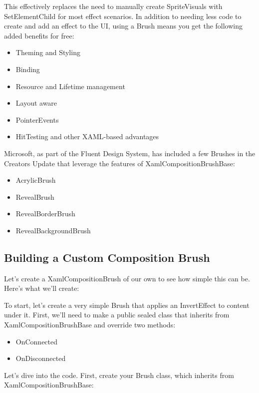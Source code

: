 This effectively replaces the need to manually create SpriteVisuals with SetElementChild for most effect scenarios. In addition to needing less code to create and add an effect to the UI, using a Brush means you get the following added benefits for free:

\begin{itemize}
	\item Theming and Styling
	\item Binding
	\item Resource and Lifetime management
	\item Layout aware
	\item PointerEvents
	\item HitTesting and other XAML-based advantages
\end{itemize}

Microsoft, as part of the Fluent Design System, has included a few Brushes in the Creators Update that leverage the features of XamlCompositionBrushBase:

\begin{itemize}
	\item AcrylicBrush
	\item RevealBrush
	\item RevealBorderBrush
	\item RevealBackgroundBrush
\end{itemize}

\subsection{Building a Custom Composition Brush}

Let’s create a XamlCompositionBrush of our own to see how simple this can be.  Here’s what we’ll create:


To start, let’s create a very simple Brush that applies an InvertEffect to content under it. First, we’ll need to make a public sealed class that inherits from XamlCompositionBrushBase and override two methods:

\begin{itemize}
	\item OnConnected
	\item OnDisconnected
\end{itemize}

Let’s dive into the code. First, create your Brush class, which inherits from XamlCompositionBrushBase:

